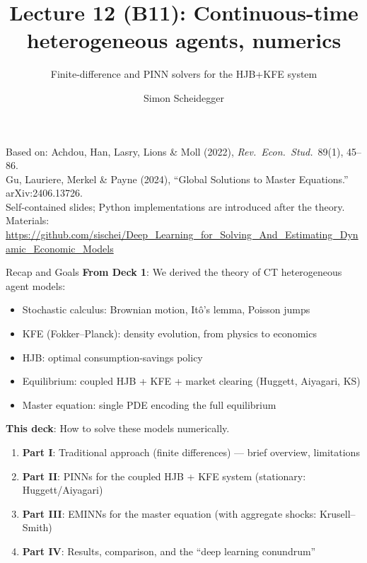 \documentclass[aspectratio=169,11pt]{beamer}
\title[Lecture 12 (B11)]{Lecture 12 (B11): Continuous-time heterogeneous agents, numerics}
\subtitle{Finite-difference and PINN solvers for the HJB+KFE system}
\author{Simon Scheidegger}
\institute{HEC, University of Lausanne}
\date{}
\newcommand{\emphc}[1]{\textcolor{harvardcrimson}{#1}}
\begin{document}

{
\begin{frame}
\titlepage
\vspace{-0.4cm}
\begin{center}
{\footnotesize Based on: Achdou, Han, Lasry, Lions \& Moll (2022), \emph{Rev.\ Econ.\ Stud.}\ 89(1), 45--86.}\\[2pt]
{\footnotesize Gu, Lauriere, Merkel \& Payne (2024), ``Global Solutions to Master Equations.'' arXiv:2406.13726.}\\[2pt]
{\footnotesize Self-contained slides; Python implementations are introduced after the theory.}\\[4pt]
{\footnotesize Materials: \url{https://github.com/sischei/Deep_Learning_for_Solving_And_Estimating_Dynamic_Economic_Models}}
\end{center}
\end{frame}
}

\begin{frame}{Recap and Goals}
\textbf{From Deck 1}: We derived the \emphc{theory} of CT heterogeneous agent models:
\begin{itemize}\itemsep2pt
    \item Stochastic calculus: Brownian motion, It\^o's lemma, Poisson jumps
    \item KFE (Fokker--Planck): density evolution, from physics to economics
    \item HJB: optimal consumption-savings policy
    \item Equilibrium: coupled HJB + KFE + market clearing (Huggett, Aiyagari, KS)
    \item Master equation: single PDE encoding the full equilibrium
\end{itemize}

\vspace{0.4em}
\textbf{This deck}: How to \emphc{solve} these models numerically.
\begin{enumerate}\itemsep3pt
    \item \textbf{Part I}: Traditional approach (finite differences) --- brief overview, limitations
    \item \textbf{Part II}: \emphc{PINNs for the coupled HJB + KFE system} (stationary: Huggett/Aiyagari)
    \item \textbf{Part III}: \emphc{EMINNs for the master equation} (with aggregate shocks: Krusell--Smith)
    \item \textbf{Part IV}: Results, comparison, and the ``deep learning conundrum''
\end{enumerate}
\end{frame}
\end{document}
